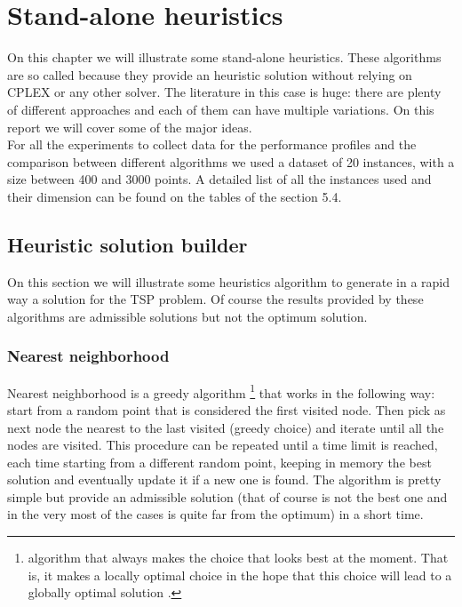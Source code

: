 \chapter{Stand-alone heuristics}
On this chapter we will illustrate some stand-alone heuristics. These algorithms are so called because they provide an heuristic solution without relying on CPLEX or any other solver. The literature in this case is huge: there are plenty of different approaches and each of them can have multiple variations. On this report we will cover some of the major ideas. \\
For all the experiments to collect data for the performance profiles and the comparison between different algorithms we used a dataset of 20 instances, with a size between 400 and 3000 points. A detailed list of all the instances used and their dimension can be found on the tables of the section 5.4.

\section{Heuristic solution builder}
On this section we will illustrate some heuristics algorithm to generate in a rapid way a solution for the TSP problem. Of course the results provided by these algorithms are admissible solutions but not the optimum solution.

\subsection{Nearest neighborhood}
Nearest neighborhood is a greedy algorithm \footnote{algorithm that always makes the choice that looks best at the moment. That is, it makes a locally optimal choice in the hope that this choice
will lead to a globally optimal solution \cite{10.5555/1614191}.	 
} that works in the following way: start from a random point that is considered the first visited node. Then pick as next node the nearest to the last visited (greedy choice) and iterate until all the nodes are visited. This procedure can be repeated until a time limit is reached, each time starting from a different random point, keeping in memory the best solution and eventually update it if a new one is found. The algorithm is pretty simple but provide an admissible solution (that of course is not the best one and in the very most of the cases is quite far from the optimum) in a short time. \\

